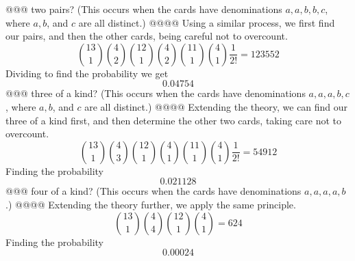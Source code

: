 \documentclass[10pt]{article}
\begin{document}
\begin{easylist}[enumerate]
    @@@ two pairs? (This occurs when the cards have denominations $a, a, b, b, c$, where $a, b$, and $c$ are all distinct.)
    @@@@ Using a similar process, we first find our pairs, and then the other cards, being careful not to overcount.
        \[ \binom{13}{1}\binom{4}{2} \binom{12}{1} \binom{4}{2} \binom{11}{1} \binom{4}{1} \frac{1}{2!} = 123552 \]
        Dividing to find the probability we get
        \[ \boxed{0.04754} \]
    @@@ three of a kind? (This occurs when the cards have denominations $a, a, a, b, c$, where $a, b$, and $c$ are all distinct.)
    @@@@ Extending the theory, we can find our three of a kind first, and then determine the other two cards, taking care not to overcount.
        \[ \binom{13}{1} \binom{4}{3} \binom{12}{1} \binom{4}{1} \binom{11}{1} \binom{4}{1} \frac{1}{2!} = 54912 \]
        Finding the probability
        \[ \boxed{0.021128} \]
    @@@ four of a kind? (This occurs when the cards have denominations $a, a, a, a, b$.)
    @@@@ Extending the theory further, we apply the same principle.
        \[ \binom{13}{1} \binom{4}{4} \binom{12}{1} \binom{4}{1} = 624 \]
        Finding the probability
        \[ \boxed{0.00024} \]


\end{easylist}
\end{document}
